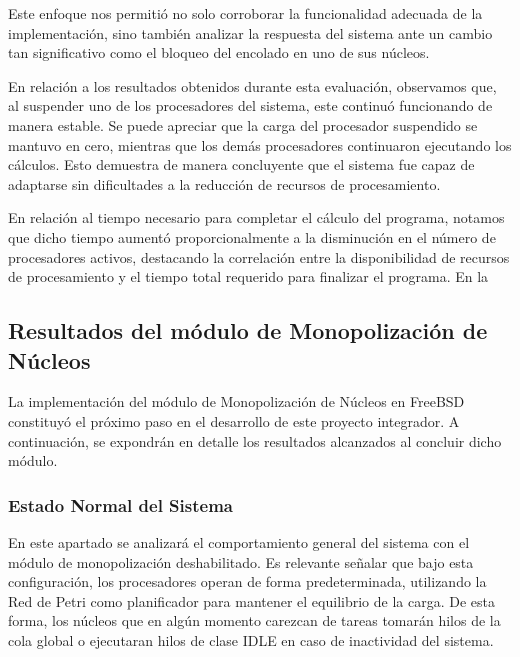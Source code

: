 Este enfoque nos permitió no solo corroborar la funcionalidad adecuada de la implementación, sino también analizar la respuesta del sistema ante un cambio tan significativo como el bloqueo del encolado en uno de sus núcleos.\par

En relación a los resultados obtenidos durante esta evaluación, observamos que, al suspender uno de los procesadores del sistema, este continuó funcionando de manera estable. Se puede apreciar que la carga del procesador suspendido se mantuvo en cero, mientras que los demás procesadores continuaron ejecutando los cálculos. Esto demuestra de manera concluyente que el sistema fue capaz de adaptarse sin dificultades a la reducción de recursos de procesamiento.\par


En relación al tiempo necesario para completar el cálculo del programa, notamos que dicho tiempo aumentó proporcionalmente a la disminución en el número de procesadores activos, destacando la correlación entre la disponibilidad de recursos de procesamiento y el tiempo total requerido para finalizar el programa. En la %





\subsection{Resultados del módulo de Monopolización de Núcleos}
La implementación del módulo de Monopolización de Núcleos en FreeBSD constituyó el próximo paso en el desarrollo de este proyecto integrador. A continuación, se expondrán en detalle los resultados alcanzados al concluir dicho módulo.\par
\subsubsection{Estado Normal del Sistema}
En este apartado se analizará el comportamiento general del sistema con el módulo de monopolización deshabilitado. Es relevante señalar que bajo esta configuración, los procesadores operan de forma predeterminada, utilizando la Red de Petri como planificador para mantener el equilibrio de la carga. De esta forma, los núcleos que en algún momento carezcan de tareas tomarán hilos de la cola global o ejecutaran hilos de clase IDLE en caso de inactividad del sistema.\par

